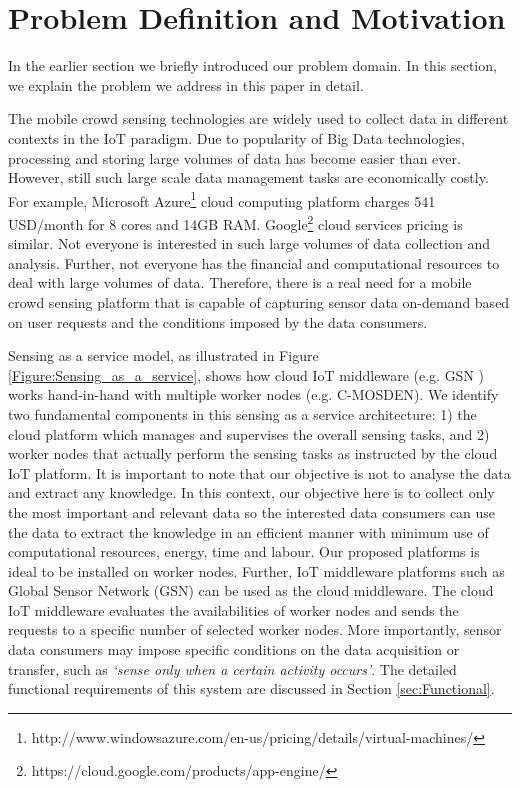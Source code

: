 \documentclass[journal]{IEEEtran}
\begin{document}
\section{Problem Definition and Motivation}
\label{sec:Problem}

In the earlier section we briefly introduced our problem domain. In this section, we explain the problem we address in this paper in detail. 


The mobile crowd sensing technologies are widely used to collect data in different contexts in the IoT paradigm. Due to popularity of Big Data technologies, processing and storing large volumes of data has become easier than ever. However, still such large scale data management tasks are economically costly. For example, Microsoft Azure\footnote{http://www.windowsazure.com/en-us/pricing/details/virtual-machines/} cloud computing platform charges  541 USD/month for 8 cores and 14GB RAM. Google\footnote{https://cloud.google.com/products/app-engine/} cloud services  pricing is similar. Not everyone is interested in such large volumes of data collection and analysis. Further, not everyone has the financial and computational resources to deal with large volumes of data. Therefore, there is a real need for a mobile crowd sensing  platform that is capable of capturing sensor data  on-demand based on user requests and the conditions imposed by the data consumers.

Sensing as a service model, as illustrated in Figure \ref{Figure:Sensing_as_a_service}, shows how cloud IoT middleware (e.g. GSN \cite{P022}) works hand-in-hand with multiple worker nodes (e.g. C-MOSDEN). We identify two fundamental components in this sensing as a service architecture: 1) the cloud platform which manages and supervises the overall sensing tasks, and 2) worker nodes that actually perform the sensing tasks as instructed by the cloud IoT platform. It is important to note that our objective is not to analyse the data and extract any knowledge. In this context, our objective here is to collect only the most important and relevant data so the interested data consumers can use the data to extract the knowledge in an efficient manner with minimum use of computational resources, energy, time and labour. Our proposed platforms is ideal to be installed on worker nodes. Further, IoT middleware platforms such as Global Sensor Network (GSN) \cite{P022} can be used as the cloud middleware. The cloud IoT middleware evaluates the availabilities of worker nodes and sends the requests to a specific number of selected worker nodes. More importantly, sensor data consumers may impose specific conditions on the data acquisition or transfer,  such as \textit{`sense only when  a certain activity occurs'}. The detailed functional requirements of this system are discussed in Section \ref{sec:Functional}.
\end{document}
